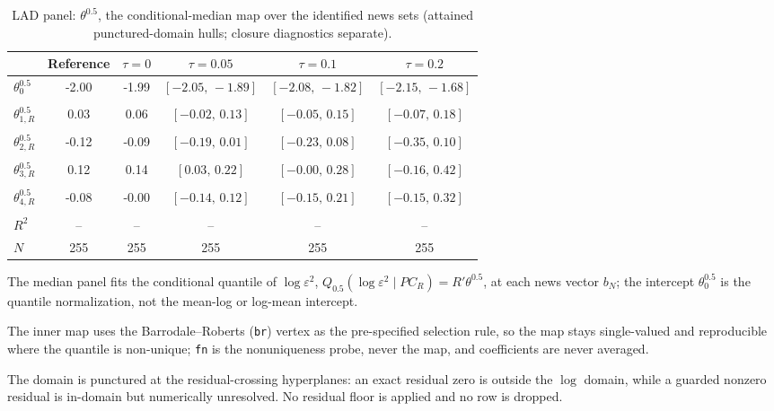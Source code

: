 \begin{table}[!htbp]
\centering
\begin{threeparttable}
\caption{LAD panel: $\theta^{0.5}$, the conditional-median map over the identified news sets (attained punctured-domain hulls; closure diagnostics separate).}
\label{tab:log_var_eq_panel_lad}
\footnotesize\setlength{\tabcolsep}{3pt}
\begin{tabular}{lccccc}
\toprule
 & Reference & $\tau{=}0$ & $\tau{=}0.05$ & $\tau{=}0.1$ & $\tau{=}0.2$ \\
\midrule
$\theta^{0.5}_0$ & -2.00 & -1.99 & $[-2.05,\,-1.89]$ & $[-2.08,\,-1.82]$ & $[-2.15,\,-1.68]$ \\
 &  &  &  &  &  \\
\midrule
$\theta^{0.5}_{1,R}$ & 0.03 & 0.06 & $[-0.02,\,0.13]$ & $[-0.05,\,0.15]$ & $[-0.07,\,0.18]$ \\
 &  &  &  &  &  \\
$\theta^{0.5}_{2,R}$ & -0.12 & -0.09 & $[-0.19,\,0.01]$ & $[-0.23,\,0.08]$ & $[-0.35,\,0.10]$ \\
 &  &  &  &  &  \\
$\theta^{0.5}_{3,R}$ & 0.12 & 0.14 & $[0.03,\,0.22]$ & $[-0.00,\,0.28]$ & $[-0.16,\,0.42]$ \\
 &  &  &  &  &  \\
$\theta^{0.5}_{4,R}$ & -0.08 & -0.00 & $[-0.14,\,0.12]$ & $[-0.15,\,0.21]$ & $[-0.15,\,0.32]$ \\
 &  &  &  &  &  \\
$R^2$ & -- & -- & -- & -- & -- \\
$N$ & 255 & 255 & 255 & 255 & 255 \\
\bottomrule
\end{tabular}
\begin{tablenotes}[flushleft]
\scriptsize
\item The median panel fits the conditional quantile of $\log \varepsilon^2$, $Q_{0.5}(\log \varepsilon^2 \mid PC_R) = R'\theta^{0.5}$, at each news vector $b_N$; the intercept $\theta^{0.5}_0$ is the quantile normalization, not the mean-log or log-mean intercept.
\item The inner map uses the Barrodale--Roberts (\texttt{br}) vertex as the pre-specified selection rule, so the map stays single-valued and reproducible where the quantile is non-unique; \texttt{fn} is the nonuniqueness probe, never the map, and coefficients are never averaged.
\item The domain is punctured at the residual-crossing hyperplanes: an exact residual zero is outside the $\log$ domain, while a guarded nonzero residual is in-domain but numerically unresolved. No residual floor is applied and no row is dropped.

\end{tablenotes}
\end{threeparttable}
\end{table}
